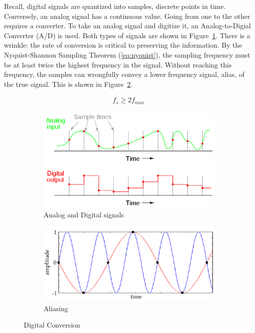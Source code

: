 \documentclass[]{article}
\begin{document}
Recall, digital signals are quantized into samples, discrete points in time.  Conversely, an analog signal has a continuous value.  Going from one to the other requires a converter.  To take an analog signal and digitize it, an Analog-to-Digial Converter (A/D) is used.  Both types of signals are shown in Figure~\ref{fig:digitization}.  There is a wrinkle: the rate of conversion is critical to preserving the information.  By the Nyquist-Shannon Sampling Theorem (\ref{eq:nyquist}), the sampling frequency must be at least twice the highest frequency in the signal.  Without reaching this frequency, the samples can wrongfully convey a lower frequency signal, alias, of the true signal.  This is shown in Figure~\ref{fig:alias}.  

\begin{align}
\label{eq:nyquist}
f_s \geq 2 f_{max}
\end{align}

\begin{figure}[h]
        \centering
        \begin{subfigure}[b]{0.4\textwidth}
                \includegraphics[width=\textwidth]{digitization.png}
                \caption{Analog and Digital signals}
                \label{fig:digitization}
        \end{subfigure}%
        \qquad \quad %
        \begin{subfigure}[b]{0.5\textwidth}
                \includegraphics[width=\textwidth]{aliasing.jpg}
                \caption{Aliasing \label{fig:alias}}
                \label{fig:alias}
        \end{subfigure}
        \caption{Digital Conversion \label{fig:digitize}}
\end{figure}
\end{document}

